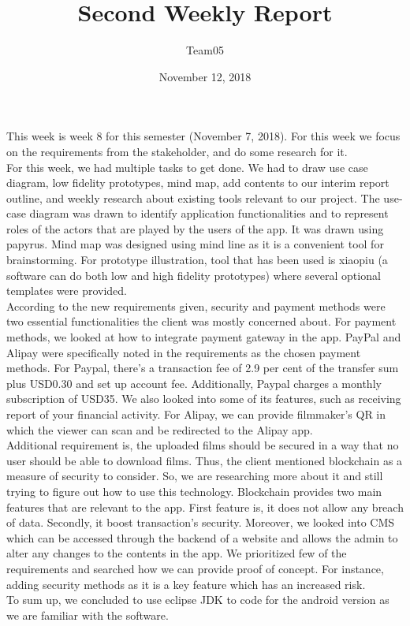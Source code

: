 \documentclass[12pt, letterpaper]{article}
\title{Second Weekly Report}
\author{Team05}
\date{November 12, 2018}
\begin{document}
\begin{titlepage}
\maketitle
\end{titlepage}

This week is week 8 for this semester (November 7, 2018). For this week we focus on the requirements from the stakeholder, and do some research for it.\\


For this week, we had multiple tasks to get done. We had to draw use case diagram, low fidelity prototypes, mind map, add contents to our interim report outline, and weekly research about existing tools relevant to our project. The  use-case diagram was drawn to identify application functionalities and to represent roles of the actors that are played by the users of the app. It was drawn using papyrus. Mind map was designed using mind line as it is a convenient tool for brainstorming. For prototype illustration, tool that has been used is xiaopiu (a software can do both low and high fidelity prototypes) where several optional templates were provided.\\


 According to the new requirements given, security and payment methods were two essential functionalities the client was mostly concerned about. For payment methods, we looked at how to integrate payment gateway in the app. PayPal and Alipay were specifically noted in the requirements as the chosen payment methods. For Paypal, there’s a transaction fee of 2.9 per cent of the transfer sum plus USD0.30 and set up account fee. Additionally, Paypal charges a monthly subscription of USD35. We also looked into some of its features, such as receiving report of your financial activity. For Alipay, we can provide filmmaker’s QR in which the viewer can scan and be redirected to the Alipay app.\\
 
 
Additional requirement is, the uploaded films should be secured in a way that no user should be able to download films. Thus, the client mentioned blockchain as a measure of security to consider. So, we are researching more about it and still trying to figure out how to use this technology. Blockchain provides two main features that are relevant to the app. First feature is, it does not allow any breach of data. Secondly, it boost transaction’s security. Moreover, we looked into CMS which can be accessed through the backend of a website and allows the admin to alter any changes to the contents in the app. We prioritized few of the requirements and searched how we can provide proof of concept. For instance, adding security methods as it is a key feature which has an increased risk.\\

To sum up, we concluded to use eclipse JDK to code for the android version as we are familiar with the software.
\end{document}

